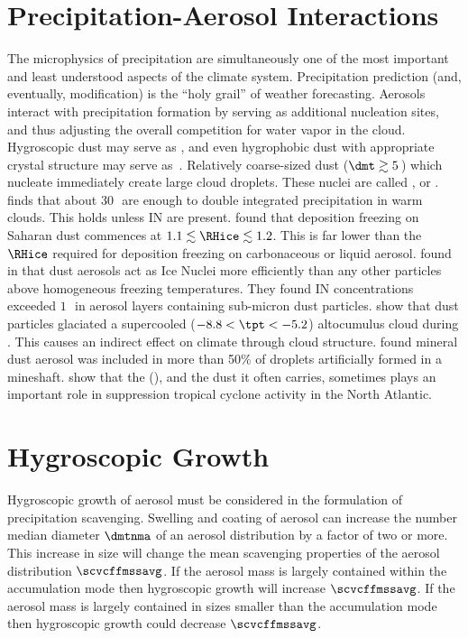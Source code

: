 \documentclass[12pt,twoside]{book}
\begin{document}
\section[Precipitation-Aerosol Interactions]{Precipitation-Aerosol Interactions}\label{sxn:pcp_aer}\label{sxn:ndr}
The microphysics of precipitation are simultaneously one of the most
important and least understood aspects of the climate system.
Precipitation prediction (and, eventually, modification) is the 
``holy grail'' of weather forecasting.
Aerosols interact with precipitation formation by serving as
additional nucleation sites, and thus adjusting the overall
competition for water vapor in the cloud.
Hygroscopic dust may serve as , and even hygrophobic dust
with appropriate crystal structure may serve as~.
Relatively coarse-sized dust ($\dmt \gtrsim 5$\,\um) which nucleate
immediately create large cloud droplets.
These nuclei are called , or
. 
 finds that about 30\,\GCCNxcmC\ are
enough to double integrated precipitation in warm clouds.
This holds unless IN are present.
 found that deposition freezing
on Saharan dust commences at $1.1 \lesssim \RHice \lesssim 1.2$.
This is far lower than the $\RHice$ required for deposition freezing
on carbonaceous or liquid aerosol.
\cite{DSP03} found in that dust aerosols act as
Ice Nuclei more efficiently than any other particles above
homogeneous freezing temperatures. 
They found IN concentrations exceeded $1$\,\xcmC\ in aerosol layers
containing sub-micron dust particles.
\cite{SDP03} show that dust particles glaciated a supercooled
($-8.8 < \tpt < -5.2$\dgrc) altocumulus cloud during
.
This causes an indirect effect on climate through cloud structure.
\cite{YTT04} found mineral dust aerosol was included in more than 50\%
of droplets artificially formed in a mineshaft.
\cite{DuV04} show that the  (),
and the dust it often carries, sometimes plays an important role in
suppression tropical cyclone activity in the North Atlantic. 

\section{Hygroscopic Growth}\label{sxn:scv_hyg}
Hygroscopic growth of aerosol must be considered in the formulation of
precipitation scavenging.
Swelling and coating of aerosol can increase the number median
diameter $\dmtnma$ of an aerosol distribution by a factor of two or
more. 
This increase in size will change the mean scavenging properties of
the aerosol distribution $\scvcffmssavg$. 
If the aerosol mass is largely contained within the accumulation mode
then hygroscopic growth will increase $\scvcffmssavg$.
If the aerosol mass is largely contained in sizes smaller than the
accumulation mode then hygroscopic growth could decrease
$\scvcffmssavg$. 
\end{document}
